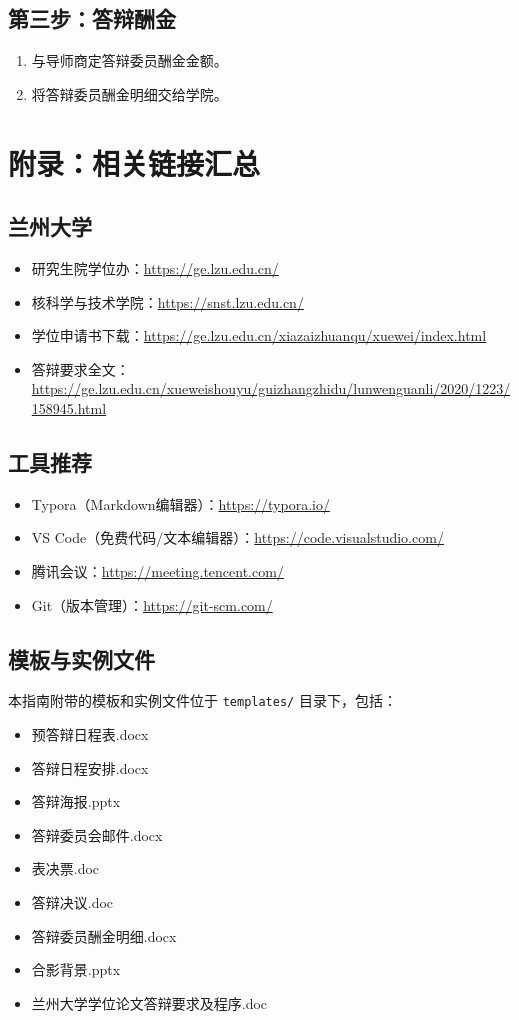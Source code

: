 \documentclass[12pt,a4paper,openany]{ctexbook}
\begin{document}
\section{第三步：答辩酬金}

\begin{enumerate}
  \item 与导师商定答辩委员酬金金额。
  \item 将答辩委员酬金明细交给学院。
\end{enumerate}

\chapter{附录：相关链接汇总}

\section{兰州大学}

\begin{itemize}
  \item 研究生院学位办：\url{https://ge.lzu.edu.cn/}
  \item 核科学与技术学院：\url{https://snst.lzu.edu.cn/}
  \item 学位申请书下载：\url{https://ge.lzu.edu.cn/xiazaizhuanqu/xuewei/index.html}
  \item 答辩要求全文：\url{https://ge.lzu.edu.cn/xueweishouyu/guizhangzhidu/lunwenguanli/2020/1223/158945.html}
\end{itemize}

\section{工具推荐}

\begin{itemize}
  \item Typora（Markdown编辑器）：\url{https://typora.io/}
  \item VS Code（免费代码/文本编辑器）：\url{https://code.visualstudio.com/}
  \item 腾讯会议：\url{https://meeting.tencent.com/}
  \item Git（版本管理）：\url{https://git-scm.com/}
\end{itemize}

\section{模板与实例文件}

本指南附带的模板和实例文件位于 \texttt{templates/} 目录下，包括：

\begin{itemize}
  \item 预答辩日程表.docx
  \item 答辩日程安排.docx
  \item 答辩海报.pptx
  \item 答辩委员会邮件.docx
  \item 表决票.doc
  \item 答辩决议.doc
  \item 答辩委员酬金明细.docx
  \item 合影背景.pptx
  \item 兰州大学学位论文答辩要求及程序.doc
\end{itemize}
\end{document}
